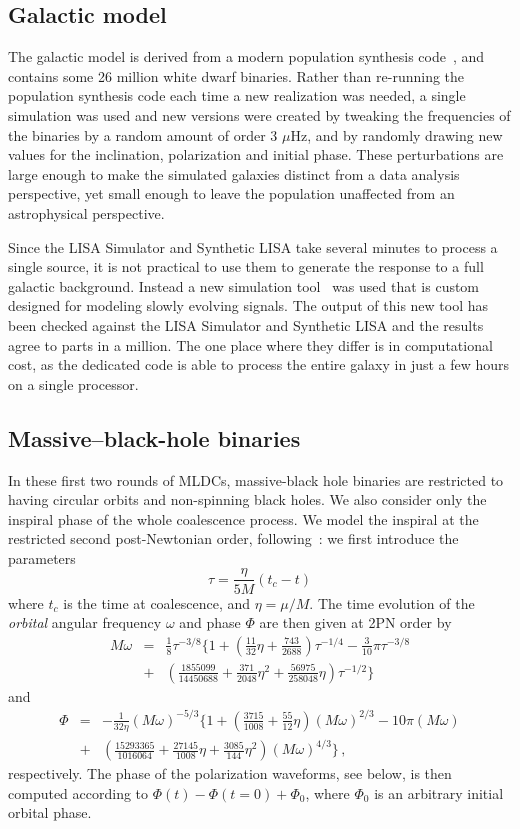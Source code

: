 \documentclass[12pt]{iopart}
\def\be{\begin{equation}}
\def\ee{\end{equation}}
\def\bea{\begin{eqnarray}}
\def\eea{\end{eqnarray}}
\begin{document}
\subsection{Galactic model}
\label{ss:galaxy}

The galactic model is derived from a modern population synthesis code~\cite{gijs}, and contains some 26 million white dwarf binaries.
Rather than re-running the population synthesis code each time a new realization was needed, a single simulation was used and new
versions were created by tweaking the frequencies of the binaries by a random amount of order 3 $\mu$Hz,
and by randomly drawing new values for the inclination, polarization and initial phase. These perturbations are large enough to make the
simulated galaxies distinct from a data analysis perspective, yet small enough to leave the population unaffected from an astrophysical
perspective. 

Since the LISA Simulator and Synthetic LISA take several minutes to process a single source, it is not practical to use them to
generate the response to a full galactic background. Instead a new simulation tool~\cite{cornish_littenberg} was used that
is custom designed for modeling slowly evolving signals. The output of this new tool has been checked against
the LISA Simulator and Synthetic LISA and the results agree to parts in a million. The one place where they differ is
in computational cost, as the dedicated code is able to process the entire galaxy in just a few hours on a single processor.

\subsection{Massive--black-hole binaries}

In these first two rounds of MLDCs, massive-black hole binaries are restricted to having circular orbits and non-spinning black holes. We also consider only the inspiral phase of the whole coalescence process. We model the inspiral at the restricted second post-Newtonian order, following~\cite{Blanchet,DIS}: we first introduce the parameters
\be
\tau =  \frac{\eta}{5M}(t_c - t)
\ee
where $t_c$ is the time at coalescence, and $\eta = \mu/M$. The time evolution of the \emph{orbital} angular frequency $\omega$ and phase $\Phi$ are then given at 2PN order by
\bea
M\omega &=& \frac{1}{8} \tau^{-3/8}\Biggl\{ 1 + \left( \frac{11}{32}\eta + \frac{743}{2688}\right) 
\tau^{-1/4} - \frac{3}{10}\pi\tau^{-3/8} \nonumber \\
& + & \left(\frac{1855099}{14450688} + \frac{371}{2048}\eta^2 
+ \frac{56975}{258048}\eta\right)
\tau^{-1/2}  \Biggr\}
\label{fr}
\eea
and
\bea
\Phi &=& -\frac{1}{32\eta}(M\omega)^{-5/3}\Biggl\{ 1 + \left( \frac{3715}{1008} + \frac{55}{12}\eta\right)
(M\omega)^{2/3} - 10\pi(M\omega)  \nonumber \\
&+&  \left( \frac{15293365}{1016064} + \frac{27145}{1008}\eta + \frac{3085}{144}\eta^2\right)
(M\omega)^{4/3}\Biggr\}\,,
\label{eq:Phi}
\eea
respectively. The phase of the polarization waveforms, see below, is then computed according to $\Phi(t) - \Phi(t = 0) + \Phi_0$, where $\Phi_0$ is an arbitrary initial orbital phase.
\end{document}
